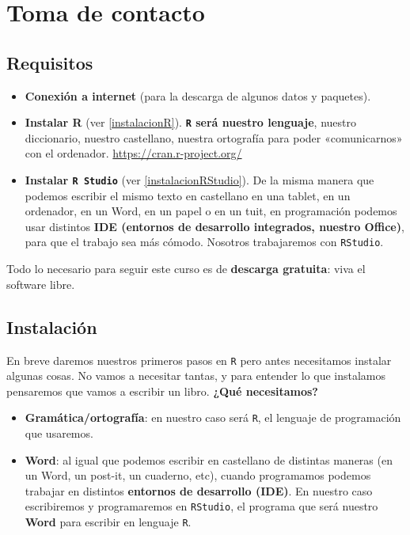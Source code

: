 \documentclass[11pt,]{book}
\providecommand{\tightlist}{%
  \setlength{\itemsep}{0pt}\setlength{\parskip}{0pt}}
\begin{document}
\hypertarget{part-toma-de-contacto}{%
\part{Toma de contacto}\label{part-toma-de-contacto}}

\hypertarget{requisitos}{%
\chapter{Requisitos}\label{requisitos}}

\begin{itemize}
\item
  \textbf{Conexión a internet} (para la descarga de algunos datos y paquetes).
\item
  \textbf{Instalar R} (ver \ref{instalacionR}). \textbf{\texttt{R} será nuestro lenguaje}, nuestro diccionario, nuestro castellano, nuestra ortografía para poder «comunicarnos» con el ordenador. \url{https://cran.r-project.org/}
\item
  \textbf{Instalar \texttt{R\ Studio}} (ver \ref{instalacionRStudio}). De la misma manera que podemos escribir el mismo texto en castellano en una tablet, en un ordenador, en un Word, en un papel o en un tuit, en programación podemos usar distintos \textbf{IDE (entornos de desarrollo integrados, nuestro Office)}, para que el trabajo sea más cómodo. Nosotros trabajaremos con \texttt{RStudio}.
\end{itemize}

Todo lo necesario para seguir este curso es de \textbf{descarga gratuita}: viva el software libre.

\hypertarget{instalacion}{%
\chapter{Instalación}\label{instalacion}}

En breve daremos nuestros primeros pasos en \texttt{R} pero antes necesitamos instalar algunas cosas. No vamos a necesitar tantas, y para entender lo que instalamos pensaremos que vamos a escribir un libro. \textbf{¿Qué necesitamos?}

\begin{itemize}
\tightlist
\item
  \textbf{Gramática/ortografía}: en nuestro caso será \texttt{R}, el lenguaje de programación que usaremos.
\item
  \textbf{Word}: al igual que podemos escribir en castellano de distintas maneras (en un Word, un post-it, un cuaderno, etc), cuando programamos podemos trabajar en distintos \textbf{entornos de desarrollo (IDE)}. En nuestro caso escribiremos y programaremos en \texttt{RStudio}, el programa que será nuestro \textbf{Word} para escribir en lenguaje \texttt{R}.
\end{itemize}
\end{document}
